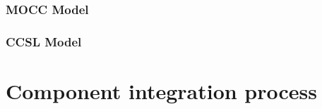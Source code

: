 \documentclass{gemoc} %
\begin{document}

\subsection{MOCC Model}


\subsection{CCSL Model}



\chapter{Component integration process}

\end{document}
